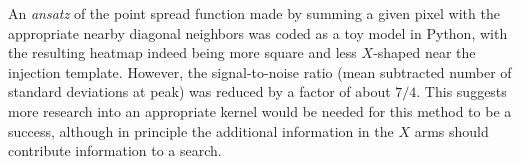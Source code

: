 An \textit{ansatz} of the point spread function made by summing a given pixel with the appropriate nearby diagonal neighbors was coded as a toy model in Python, with the resulting heatmap indeed being more square and less $X$-shaped near the injection template. However, the signal-to-noise ratio (mean subtracted number of standard deviations at peak) was reduced by a factor of about $7/4$. This suggests more research into an appropriate kernel would be needed for this method to be a success, although in principle the additional information in the $X$ arms should contribute information to a search. 








